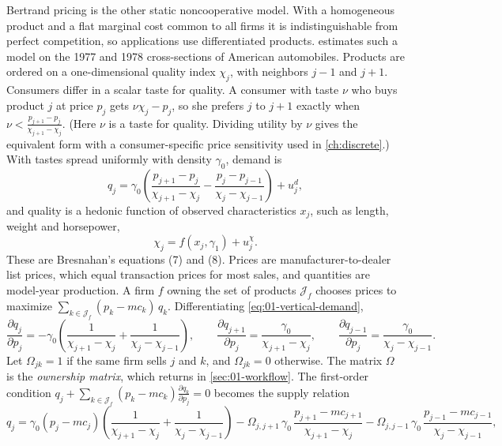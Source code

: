 Bertrand pricing is the other static noncooperative model. With a homogeneous product and a flat marginal cost common to all firms
it is indistinguishable from perfect competition, so applications use differentiated products. \citet{Bresnahan1981}
estimates such a model on the 1977 and 1978 cross-sections of American automobiles. Products are ordered on a
one-dimensional quality index $\chi_j$, with neighbors $j - 1$ and $j + 1$. Consumers differ in a scalar taste for
quality. A consumer with taste $\nu$ who buys product $j$ at price $p_j$ gets $\nu\chi_j - p_j$, so she prefers $j$ to
$j + 1$ exactly when $\nu < \frac{p_{j+1} - p_j}{\chi_{j+1} - \chi_j}$. (Here $\nu$ is a taste for quality. Dividing
utility by $\nu$ gives the equivalent form with a consumer-specific price sensitivity used in \cref{ch:discrete}.) With
tastes spread uniformly with density $\gamma_0$, demand is
\begin{equation}\label{eq:01-vertical-demand}
q_j = \gamma_0\left(\frac{p_{j+1} - p_j}{\chi_{j+1} - \chi_j} - \frac{p_j - p_{j-1}}{\chi_j - \chi_{j-1}}\right) + u^d_j ,
\end{equation}
and quality is a hedonic function of observed characteristics $x_j$, such as length, weight and horsepower,
\begin{equation}\label{eq:01-vertical-quality}
\chi_j = f(x_j, \gamma_1) + u^{\chi}_j .
\end{equation}
These are Bresnahan's equations (7) and (8). Prices are manufacturer-to-dealer list prices, which equal transaction
prices for most sales, and quantities are model-year production. A firm $f$ owning the set of products
$\mathcal{J}_f$ chooses prices to maximize $\sum_{k \in \mathcal{J}_f} (p_k - mc_k)\,q_k$. Differentiating
\eqref{eq:01-vertical-demand},
\begin{equation*}
\frac{\partial q_j}{\partial p_j} = -\gamma_0\left(\frac{1}{\chi_{j+1} - \chi_j} + \frac{1}{\chi_j - \chi_{j-1}}\right),
\qquad
\frac{\partial q_{j+1}}{\partial p_j} = \frac{\gamma_0}{\chi_{j+1} - \chi_j},
\qquad
\frac{\partial q_{j-1}}{\partial p_j} = \frac{\gamma_0}{\chi_j - \chi_{j-1}} .
\end{equation*}
Let $\Omega_{jk} = 1$ if the same firm sells $j$ and $k$, and $\Omega_{jk} = 0$ otherwise. The matrix $\Omega$ is the
\emph{ownership matrix}, which returns in \cref{sec:01-workflow}. The first-order condition $q_j + \sum_{k \in \mathcal{J}_f}(p_k - mc_k)\frac{\partial q_k}{\partial p_j} = 0$ becomes
the supply relation
\begin{equation}\label{eq:01-vertical-foc}
q_j = \gamma_0 (p_j - mc_j)\left(\frac{1}{\chi_{j+1} - \chi_j} + \frac{1}{\chi_j - \chi_{j-1}}\right)
 - \Omega_{j,j+1}\,\gamma_0\,\frac{p_{j+1} - mc_{j+1}}{\chi_{j+1} - \chi_j}
 - \Omega_{j,j-1}\,\gamma_0\,\frac{p_{j-1} - mc_{j-1}}{\chi_j - \chi_{j-1}} ,
\end{equation}
